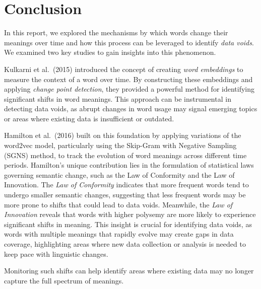 
\section{Conclusion}\label{sec:}
In this report, we explored the mechanisms by which words change their meanings over time and how this process can be leveraged to identify \emph{data voids}.
We examined two key studies to gain insights into this phenomenon.

Kulkarni et al.\ (2015) introduced the concept of creating \emph{word embeddings} to measure the context of a word over time.
By constructing these embeddings and applying \emph{change point detection}, they provided a powerful method for identifying significant shifts in word meanings.
This approach can be instrumental in detecting data voids, as abrupt changes in word usage may signal emerging topics or areas where existing data is insufficient or outdated.

Hamilton et al.\ (2016) built on this foundation by applying variations of the word2vec model, particularly using the Skip-Gram with Negative Sampling (SGNS) method,
to track the evolution of word meanings across different time periods.
Hamilton’s unique contribution lies in the formulation of statistical laws governing semantic change, such as the Law of Conformity and the Law of Innovation.
The \emph{Law of Conformity} indicates that more frequent words tend to undergo smaller semantic changes,
suggesting that less frequent words may be more prone to shifts that could lead to data voids.
Meanwhile, the \emph{Law of Innovation} reveals that words with higher polysemy are more likely to experience significant shifts in meaning.
This insight is crucial for identifying data voids, as words with multiple meanings that rapidly evolve may create gaps in data coverage,
highlighting areas where new data collection or analysis is needed to keep pace with linguistic changes.

Monitoring such shifts can help identify areas where existing data may no longer capture the full spectrum of meanings.